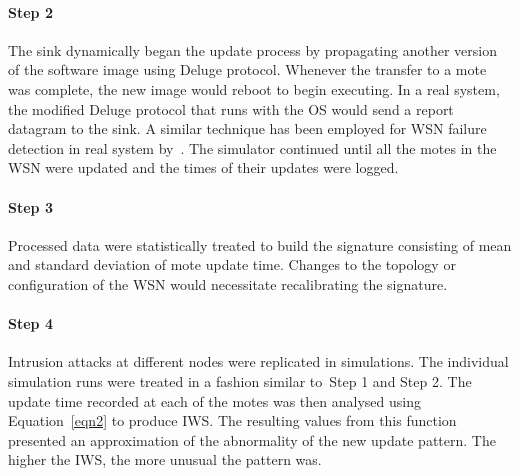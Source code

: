 \documentclass{CRPITStyle}
\renewcommand{\cite}{\citep}
\begin{document}
\paragraph*{Step 2}  The sink dynamically began the update process by propagating another version of the software image using Deluge protocol. %
Whenever the transfer to a mote was complete, the new image would  reboot to begin executing.
In a real system, the modified Deluge protocol that runs with the OS would send a report datagram to the sink.
A similar technique has been employed  for WSN failure detection in real system by~\cite{Kam14}.
The simulator continued until all the motes in the WSN were updated and the times of their updates were logged. 
\paragraph*{Step 3}  Processed data  were statistically treated to build the signature consisting of mean and standard deviation of  mote update time.
Changes to the topology or configuration of the WSN would necessitate recalibrating the signature.
\paragraph*{Step 4}   Intrusion attacks at different nodes were replicated in simulations.
The individual simulation runs were treated in a fashion  similar to~Step 1 and Step 2.
The update time recorded at each of the motes was then analysed using Equation~\ref{eqn2} to produce IWS.
The resulting values from this function presented an approximation of the abnormality of the new update pattern. The higher the IWS, the more unusual the pattern was. 
\end{document}
